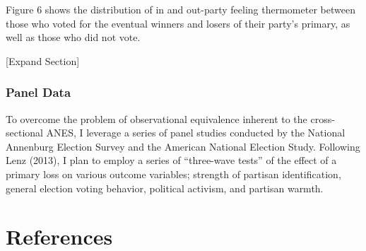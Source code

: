 \documentclass[
  12,
]{paper}
\begin{document}
Figure 6 shows the distribution of in and out-party feeling thermometer
between those who voted for the eventual winners and losers of their
party's primary, as well as those who did not vote.

{[}Expand Section{]}

\hypertarget{panel-data}{%
\subsubsection{Panel Data}\label{panel-data}}

To overcome the problem of observational equivalence inherent to the
cross-sectional ANES, I leverage a series of panel studies conducted by
the National Annenburg Election Survey and the American National
Election Study. Following Lenz (2013), I plan to employ a series of
``three-wave tests'' of the effect of a primary loss on various outcome
variables; strength of partisan identification, general election voting
behavior, political activism, and partisan warmth.

\clearpage

\hypertarget{references}{%
\section*{References}\label{references}}
\end{document}
